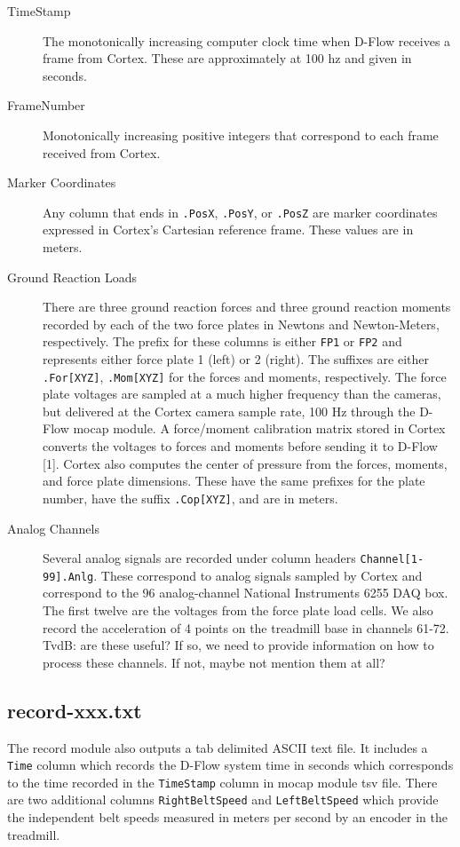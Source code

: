 \documentclass[fleqn,10pt]{wlpeerj}
\begin{document}
\begin{description}
  \item[TimeStamp] The monotonically increasing computer clock time when D-Flow
    receives a frame from Cortex. These are approximately at 100 hz and given
    in seconds.
  \item[FrameNumber] Monotonically increasing positive integers that correspond
    to each frame received from Cortex.
  \item[Marker Coordinates] Any column that ends in \verb+.PosX+, \verb+.PosY+,
    or \verb+.PosZ+ are marker coordinates expressed in Cortex's Cartesian
    reference frame. These values are in meters.
  \item[Ground Reaction Loads] There are three ground reaction forces and three
    ground reaction moments recorded by each of the two force plates in Newtons
    and Newton-Meters, respectively. The prefix for these columns is either
    \verb+FP1+ or \verb+FP2+ and represents either force plate 1 (left) or 2
    (right). The suffixes are either \verb+.For[XYZ]+, \verb+.Mom[XYZ]+ for the
    forces and moments, respectively. The force plate voltages are sampled at a
    much higher frequency than the cameras, but delivered at the Cortex camera
    sample rate, 100 Hz through the D-Flow mocap module. A force/moment
    calibration matrix stored in Cortex converts the voltages to forces and
    moments before sending it to D-Flow [1]. Cortex also computes the center of
    pressure from the forces, moments, and force plate dimensions. These have
    the same prefixes for the plate number, have the suffix \verb+.Cop[XYZ]+,
    and are in meters.
  \item[Analog Channels] Several analog signals are recorded under column
    headers \verb+Channel[1-99].Anlg+. These correspond to analog signals
    sampled by Cortex and correspond to the 96 analog-channel National
    Instruments 6255 DAQ box. The first twelve are the voltages from the
    force plate load cells. We also record the acceleration of 4 points on the
    treadmill base in channels 61-72.  TvdB: are these useful?  If so, we need to
    provide information on how to process these channels. If not, maybe
    not mention them at all?
\end{description}

\subsection*{record-xxx.txt}
%
The record module also outputs a tab delimited ASCII text file. It includes a
\verb+Time+ column which records the D-Flow system time in seconds which
corresponds to the time recorded in the \verb+TimeStamp+ column in mocap module
tsv file. There are two additional columns \verb+RightBeltSpeed+ and
\verb+LeftBeltSpeed+ which provide the independent belt speeds measured in
meters per second by an encoder in the treadmill.
\end{document}
